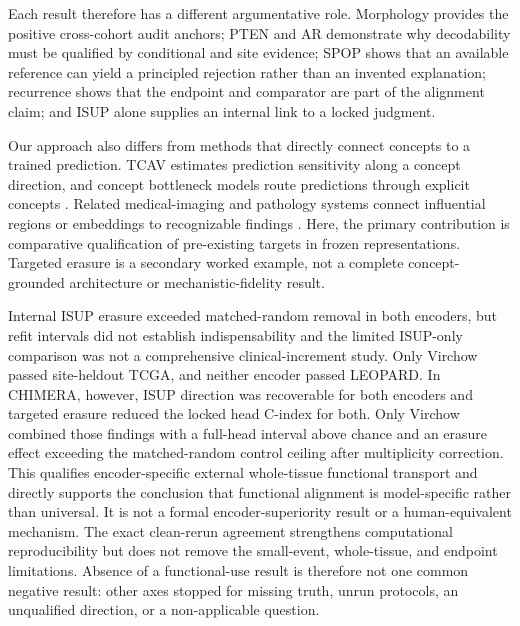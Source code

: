Each result therefore has a different argumentative role. Morphology provides the positive
cross-cohort audit anchors; PTEN and AR demonstrate why decodability must be qualified by
conditional and site evidence; SPOP shows that an available reference can yield a principled
rejection rather than an invented explanation; recurrence shows that the endpoint and comparator
are part of the alignment claim; and ISUP alone supplies an internal link to a locked judgment.

Our approach also differs from methods that directly connect concepts to a trained prediction.
TCAV estimates prediction sensitivity along a concept direction, and concept bottleneck models
route predictions through explicit concepts \cite{kim2018,koh2020}. Related medical-imaging and
pathology systems connect influential regions or embeddings to recognizable findings
\cite{lou2026,han2026}. Here, the primary contribution is comparative qualification of
pre-existing targets in frozen representations. Targeted erasure is a secondary worked example,
not a complete concept-grounded architecture or mechanistic-fidelity result.

Internal ISUP erasure exceeded matched-random removal in both encoders, but refit intervals did
not establish indispensability and the limited ISUP-only comparison was not a comprehensive
clinical-increment study. Only Virchow passed site-heldout TCGA, and neither encoder passed
LEOPARD. In CHIMERA, however, ISUP direction was recoverable for both encoders and targeted
erasure reduced the locked head C-index for both. Only Virchow combined those findings with a
full-head interval above chance and an erasure effect exceeding the matched-random control
ceiling after multiplicity correction. This qualifies encoder-specific external whole-tissue
functional transport and directly supports the conclusion that functional alignment is
model-specific rather than universal. It is not a formal encoder-superiority result or a
human-equivalent mechanism. The exact clean-rerun agreement strengthens computational
reproducibility but does not remove the small-event, whole-tissue, and endpoint limitations.
Absence of a functional-use result is therefore not one common negative result: other axes
stopped for missing truth, unrun protocols, an unqualified direction, or a non-applicable
question.

